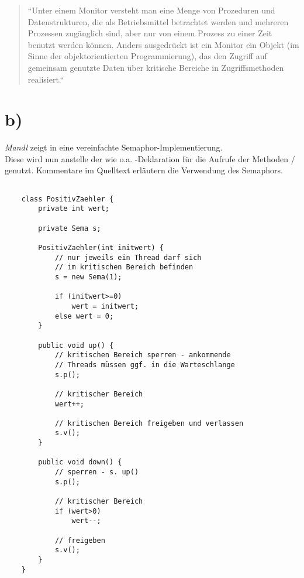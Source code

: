 \blockquote[{\cite[155]{Man20g}}]{
``Unter einem Monitor versteht man eine Menge von Prozeduren und Datenstrukturen,
    die als Betriebsmittel betrachtet werden und mehreren Prozessen zugänglich sind, aber nur
    von einem Prozess zu einer Zeit benutzt werden können. Anders ausgedrückt ist ein Monitor ein Objekt (im Sinne der objektorientierten Programmierung), das den Zugriff auf
    gemeinsam genutzte Daten über kritische Bereiche in Zugriffsmethoden realisiert.``
}

\section{b)}

\textit{Mandl} zeigt in \cite[170 f.]{Man20g} eine vereinfachte Semaphor-Implementierung.\\
Diese wird nun anstelle der wie o.a. -Deklaration für die Aufrufe der Methoden / genutzt.
Kommentare im Quelltext erläutern die Verwendung des Semaphors.

\begin{verbatim}

    class PositivZaehler {
        private int wert;

        private Sema s;

        PositivZaehler(int initwert) {
            // nur jeweils ein Thread darf sich
            // im kritischen Bereich befinden
            s = new Sema(1);

            if (initwert>=0)
                wert = initwert;
            else wert = 0;
        }

        public void up() {
            // kritischen Bereich sperren - ankommende
            // Threads müssen ggf. in die Warteschlange
            s.p();

            // kritischer Bereich
            wert++;

            // kritischen Bereich freigeben und verlassen
            s.v();
        }

        public void down() {
            // sperren - s. up()
            s.p();

            // kritischer Bereich
            if (wert>0)
                wert--;

            // freigeben
            s.v();
        }
    }
\end{verbatim}\\


